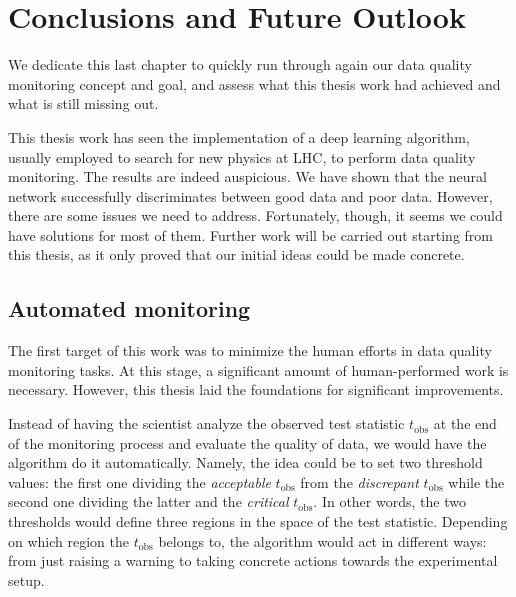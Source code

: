 \setcounter{chapter}{4}
\chapter*{Conclusions and Future Outlook}
 
\label{chap:Conclusions}


We dedicate this last chapter to quickly run through again our data quality monitoring concept and goal, and assess what
this thesis work had achieved and what is still missing out. 


This thesis work has seen the implementation of a deep learning algorithm, usually employed to search for new physics at
LHC, to perform data quality monitoring. The results are indeed auspicious. We have shown that the neural network
successfully discriminates between good data and poor data. However, there are some issues we need to address.
Fortunately, though, it seems we could have solutions for most of them. Further work will be carried out starting from
this thesis, as it only proved that our initial ideas could be made concrete. 

\setcounter{section}{0}
\section{Automated monitoring}

The first target of this work was to minimize the human efforts in data quality monitoring tasks. At this stage, a
significant amount of human-performed work is necessary. However, this thesis laid the foundations for significant
improvements. 

Instead of having the scientist analyze the observed test statistic $t_{\text{obs}}$ at the end of the
monitoring process and evaluate the quality of data, we would have the algorithm do it automatically. Namely, the idea
could be to set two threshold values: the first one dividing the \textit{acceptable} $t_{\text{obs}}$ from the
\textit{discrepant} $t_{\text{obs}}$ while the second one dividing the latter and the \textit{critical}
$t_{\text{obs}}$. In other words, the two thresholds would define three regions in the space of the test statistic.
Depending on which region the $t_{\text{obs}}$ belongs to, the algorithm would act in different ways: from just raising
a warning to taking concrete actions towards the experimental setup. 


